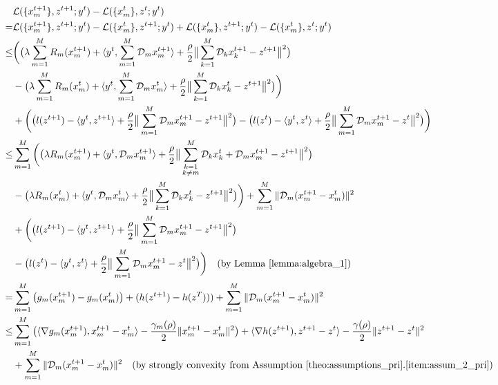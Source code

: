 \begin{align}
    & \mathcal{L}(\{x_m^{t+1}\},z^{t+1};y^{t}) - \mathcal{L}(\{x_m^{t}\},z^{t};y^{t})\nonumber\\
    = & \mathcal{L}(\{x_m^{t+1}\},z^{t+1};y^{t}) - \mathcal{L}(\{x_m^{t}\},z^{t+1};y^{t}) + \mathcal{L}(\{x_m^{t}\},z^{t+1};y^{t}) - \mathcal{L}(\{x_m^{t}\},z^{t};y^{t})\nonumber\\
    \le & \bigg(\big(\lambda \sum_{m=1}^{M}R_m(x_m^{t+1}) + \langle y^t, \sum_{m=1}^{M}\mathcal{D}_mx_m^{t+1}\rangle + \frac{\rho}{2}\big\|\sum_{k=1}^M \mathcal{D}_kx_k^{t+1} - z^{t+1}\big\|^2\big)\nonumber\\
    & - \big(\lambda \sum_{m=1}^{M}R_m(x_m^{t}) + \langle y^t, \sum_{m=1}^{M}\mathcal{D}_mx_m^{t}\rangle + \frac{\rho}{2}\big\|\sum_{k=1}^M \mathcal{D}_kx_k^{t} - z^{t+1}\big\|^2\big)\bigg)\nonumber\\
    & + \bigg(\big(l(z^{t+1}) -\langle y^t, z^{t+1}\rangle + \frac{\rho}{2} \big\|\sum_{m=1}^{M} \mathcal{D}_mx_m^{t+1} - z^{t+1}\big\|^2\big)-\big(l(z^{t}) -\langle y^t, z^{t}\rangle+ \frac{\rho}{2} \big\|\sum_{m=1}^{M} \mathcal{D}_mx_m^{t+1} - z^{t}\big\|^2\big)\bigg)\nonumber\\
    \le & \sum_{m=1}^{M} \bigg(\big(\lambda R_m(x_m^{t+1}) + \langle y^t, \mathcal{D}_mx_m^{t+1}\rangle + \frac{\rho}{2}\big\|\sum_{\substack{k=1\\k\neq m}}^M\mathcal{D}_kx_k^{t} + \mathcal{D}_mx_m^{t+1} - z^{t+1}\big\|^2\big)\nonumber\\
    & - \big(\lambda R_m(x_m^{t}) + \langle y^t, \mathcal{D}_mx_m^{t}\rangle + \frac{\rho}{2}\big\|\sum_{k=1}^{M}\mathcal{D}_kx_k^{t} - z^{t+1}\big\|^2\big)\bigg)+\sum_{m=1}^{M} \|\mathcal{D}_m(x_m^{t+1} - x_m^t)\|^2\nonumber\\
    & + \bigg(\big(l(z^{t+1}) -\langle y^t, z^{t+1}\rangle + \frac{\rho}{2} \big\|\sum_{m=1}^{M} \mathcal{D}_mx_m^{t+1} - z^{t+1}\big\|^2\big)\nonumber\\
    & -\big(l(z^{t}) -\langle y^t, z^{t}\rangle+ \frac{\rho}{2} \big\|\sum_{m=1}^{M} \mathcal{D}_mx_m^{t+1} - z^{t}\big\|^2\big)\bigg)\quad\text{(by Lemma~\ref{lemma:algebra_1})}\nonumber\\
    = & \sum_{m=1}^{M} \big(g_m(x_m^{t+1}) - g_m(x_m^t)\big) + (h(z^{t+1}) - h(z^T)))+\sum_{m=1}^{M} \|\mathcal{D}_m(x_m^{t+1} - x_m^t)\|^2\nonumber\\
    \le & \sum_{m=1}^{M} \big(\langle \nabla g_m(x_m^{t+1}), x_m^{t+1}-x_m^t\rangle - \frac{\gamma_m(\rho)}{2}\|x_m^{t+1}-x_m^t\|^2\big) + \langle\nabla h(z^{t+1}), z^{t+1} - z^t\rangle - \frac{\gamma(\rho)}{2}\|z^{t+1} - z^t\|^2\nonumber\\
    & +\sum_{m=1}^{M} \|\mathcal{D}_m(x_m^{t+1} - x_m^t)\|^2\quad\text{(by strongly convexity from Assumption~\ref{theo:assumptions_pri}.\ref{item:assum_2_pri})}\nonumber
\end{align}
